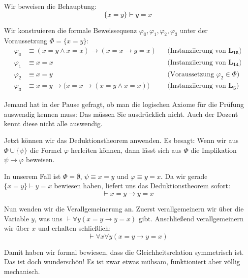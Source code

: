\begin{math-stroke}
Wir beweisen die Behauptung:
\[ \{x = y\} \vdash y = x \]

\begin{short-proof}
Wir konstruieren die formale Beweissequenz $\varphi_0, \varphi_1, \varphi_2, \varphi_3$ unter der Voraussetzung $\Phi = \{x = y\}$:
\begin{align}
\varphi_0 &\equiv (x = y \wedge x = x) \rightarrow (x = x \rightarrow y = x) && \text{(Instanziierung von $\mathbf{L_{15}}$)} \label{eq:sym-step0} \\
\varphi_1 &\equiv x = x && \text{(Instanziierung von $\mathbf{L_{14}}$)} \label{eq:sym-step1} \\
\varphi_2 &\equiv x = y && \text{(Voraussetzung $\varphi_2 \in \Phi$)} \label{eq:sym-step2} \\
\varphi_3 &\equiv x = y \rightarrow \bigl(x = x \rightarrow (x = y \wedge x = x)\bigr) && \text{(Instanziierung von $\mathbf{L_5}$)} \label{eq:sym-step3}
\end{align}
\end{short-proof}
\end{math-stroke}

\begin{spoken-clean}
Jemand hat in der Pause gefragt, ob man die logischen Axiome für die Prüfung auswendig kennen muss: Das müssen Sie ausdrücklich nicht. Auch der Dozent kennt diese nicht alle auswendig.
\end{spoken-clean}

\begin{spoken-clean}[01:01:12 - 01:02:27]
Jetzt können wir das Deduktionstheorem anwenden. Es besagt: Wenn wir aus $\Phi \cup \{\psi\}$ die Formel $\varphi$ herleiten können, dann lässt sich aus $\Phi$ die Implikation $\psi \rightarrow \varphi$ beweisen. 

In unserem Fall ist $\Phi = \emptyset$, $\psi \equiv x = y$ und $\varphi \equiv y = x$. Da wir gerade $\{x = y\} \vdash y = x$ bewiesen haben, liefert uns das Deduktionstheorem sofort:
\[ \vdash x = y \rightarrow y = x \]

Nun wenden wir die Verallgemeinerung an. Zuerst verallgemeinern wir über die Variable $y$, was uns $\vdash \forall y (x = y \rightarrow y = x)$ gibt. Anschließend verallgemeinern wir über $x$ und erhalten schließlich:
\[ \vdash \forall x \forall y (x = y \rightarrow y = x) \]

Damit haben wir formal bewiesen, dass die Gleichheitsrelation symmetrisch ist. Das ist doch wunderschön! Es ist zwar etwas mühsam, funktioniert aber völlig mechanisch.
\end{spoken-clean}

